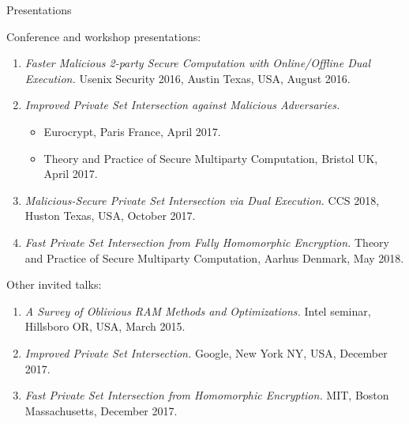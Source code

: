 \documentclass{resume} %
\begin{document}
\begin{rSection}{Presentations}
	
	Conference and workshop presentations:
	\begin{enumerate}[label=P\arabic* --]
		
		\item \emph{Faster Malicious 2-party Secure Computation with Online/Offline Dual Execution.} Usenix Security 2016, Austin Texas, USA, August 2016.
		
		\item \emph{Improved Private Set Intersection against Malicious Adversaries.} 
		\begin{itemize}
			\item Eurocrypt, Paris France, April 2017.
			\item Theory and Practice of Secure Multiparty Computation, Bristol UK, April 2017.
		\end{itemize}
	
		\item  \emph{Malicious-Secure Private Set Intersection via Dual Execution.} CCS 2018, Huston Texas, USA, October 2017.
		
		\item \emph{Fast Private Set Intersection from Fully Homomorphic Encryption.} Theory and Practice of Secure Multiparty Computation, Aarhus Denmark, May 2018.
	\end{enumerate}
	
	\bigskip
	
	Other invited talks:	
	\begin{enumerate}[label=T\arabic* --]
		
		\item \emph{A Survey of Oblivious RAM Methods and Optimizations.} Intel seminar, Hillsboro OR, USA, March 2015.
		
		\item \emph{Improved Private Set Intersection.} Google, New York NY, USA, December 2017.
		
		\item  \emph{Fast Private Set Intersection from Homomorphic Encryption.} MIT, Boston Massachusetts, December 2017.
	\end{enumerate}
	
\end{rSection}


\end{document}
